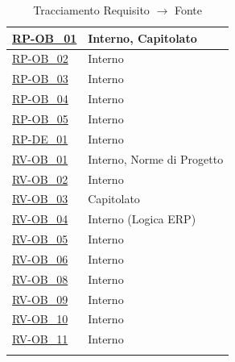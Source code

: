 \begin{longtable}{|>{\raggedright}p{}|>{\raggedright\arraybackslash}p{}|}
    \hyperlink{rp-ob_1}{RP-OB\_01} & Interno, Capitolato \\ \hline
    \hyperlink{rp-ob_2}{RP-OB\_02} & Interno \\ \hline
    \hyperlink{rp-ob_3}{RP-OB\_03} & Interno \\ \hline
    \hyperlink{rp-ob_4}{RP-OB\_04} & Interno \\ \hline
    \hyperlink{rp-ob_5}{RP-OB\_05} & Interno \\ \hline

    \hyperlink{rp-de_1}{RP-DE\_01} & Interno \\ \hline

    \hyperlink{rv-ob_1}{RV-OB\_01} & Interno, Norme di Progetto \\ \hline
    \hyperlink{rv-ob_2}{RV-OB\_02} & Interno \\ \hline
    \hyperlink{rv-ob_3}{RV-OB\_03} & Capitolato \\ \hline
    \hyperlink{rv-ob_4}{RV-OB\_04} & Interno (Logica ERP) \\ \hline
    \hyperlink{rv-ob_5}{RV-OB\_05} & Interno \\ \hline
    \hyperlink{rv-ob_6}{RV-OB\_06} & Interno \\ \hline
    \hyperlink{rv-ob_8}{RV-OB\_08} & Interno \\ \hline
    \hyperlink{rv-ob_9}{RV-OB\_09} & Interno \\ \hline
    \hyperlink{rv-ob_10}{RV-OB\_10} & Interno \\ \hline
    \hyperlink{rv-ob_11}{RV-OB\_11} & Interno \\ \hline
    
    \caption{Tracciamento Requisito $\rightarrow$ Fonte}
\end{longtable}

